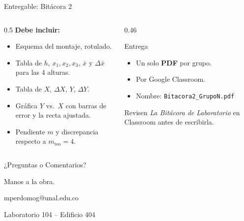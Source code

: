 \documentclass[aspectratio=169,xcolor=dvipsnames]{beamer}
\begin{document}
	\begin{frame}{Entregable: Bitácora 2}
		\begin{columns}[T]
			\begin{column}{0.5\textwidth}
				\textbf{Debe incluir:}
				\begin{itemize}
					\small
					\item Esquema del montaje, rotulado.
					\item Tabla de $h$, $x_1,x_2,x_3$, $\bar{x}$ y $\Delta\bar{x}$
					para las 4 alturas.
					\item Tabla de $X$, $\Delta X$, $Y$, $\Delta Y$.
					\item Gráfica $Y$ vs.\ $X$ con barras de error y la recta
					ajustada.
					\item Pendiente $m$ y discrepancia respecto a $m_{\text{teo}}=4$.
				\end{itemize}
			\end{column}
			\begin{column}{0.46\textwidth}
				\begin{block}{Entrega}
					\small
					\begin{itemize}
						\item Un solo \textbf{PDF} por grupo.
						\item Por Google Classroom.
						\item Nombre: \texttt{Bitacora2\_GrupoN.pdf}
					\end{itemize}
				\end{block}
				
				\vspace{0.3cm}
				\small
				Revisen \emph{La Bitácora de Laboratorio} en Classroom antes de
				escribirla.
			\end{column}
		\end{columns}
	\end{frame}
	
	\begin{frame}{¿Preguntas o Comentarios?}
		\begin{center}
			\vspace{0.5cm}
			\Large Manos a la obra.
			
			\vspace{0.8cm}
			\normalsize
			mperdomog@unal.edu.co
			
			\vspace{0.2cm}
			Laboratorio 104 -- Edificio 404
		\end{center}
	\end{frame}
	
\end{document}
